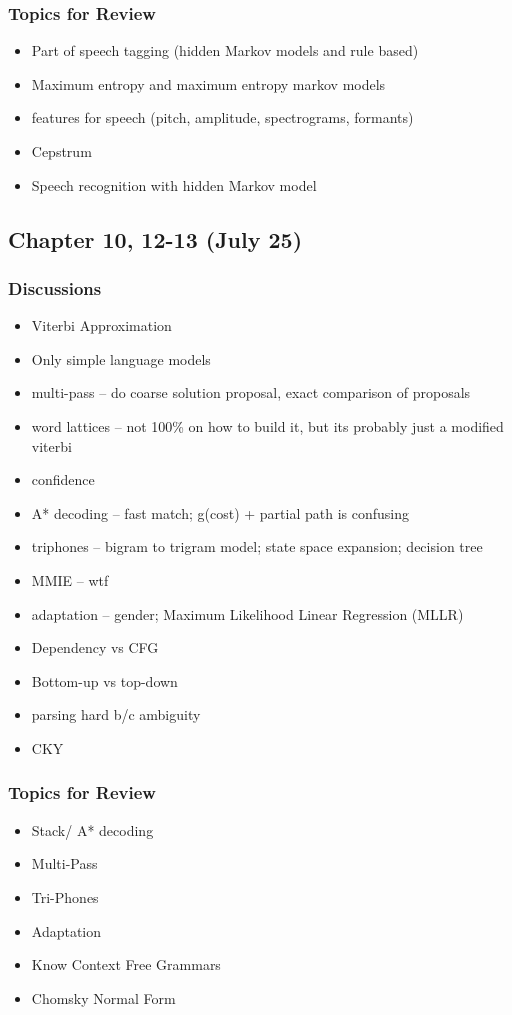 \subsubsection*{Topics for Review}
\begin{itemize}
\item Part of speech tagging (hidden Markov models and rule based)
\item Maximum entropy and maximum entropy markov models
\item features for speech (pitch, amplitude, spectrograms, formants)
\item Cepstrum
\item Speech recognition with hidden Markov model
\end{itemize}

\subsection{Chapter 10, 12-13 (July 25)}
\subsubsection*{Discussions}
\begin{itemize}
\item Viterbi Approximation
\item Only simple language models
\item multi-pass -- do coarse solution proposal, exact comparison of proposals
\item word lattices -- not 100\% on how to build it, but its probably just a modified viterbi
\item confidence
\item A* decoding -- fast match; g(cost) + partial path is confusing
\item triphones -- bigram to trigram model; state space expansion; decision tree
\item MMIE -- wtf
\item adaptation -- gender; Maximum Likelihood Linear Regression (MLLR)
\item Dependency vs CFG
\item Bottom-up vs top-down
\item parsing hard b/c ambiguity
\item CKY 
\end{itemize}
\subsubsection*{Topics for Review}
\begin{itemize}
\item Stack/ A* decoding
\item Multi-Pass
\item Tri-Phones
\item Adaptation
\item Know Context Free Grammars
\item Chomsky Normal Form
\end{itemize}

